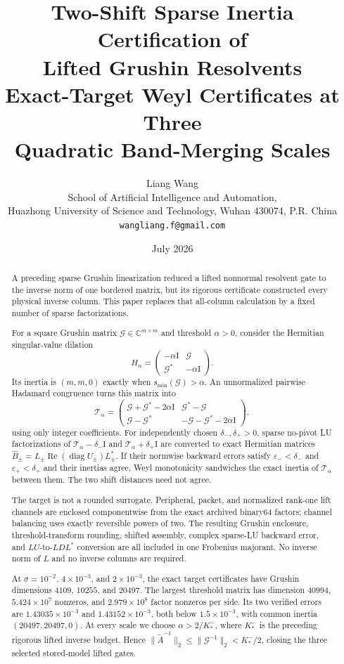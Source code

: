 \documentclass[11pt]{article}
\title{\textbf{Two-Shift Sparse Inertia Certification of\\
Lifted Grushin Resolvents}\\[0.35em]
\large Exact-Target Weyl Certificates at Three\\
Quadratic Band-Merging Scales}
\author{Liang Wang\\
\small School of Artificial Intelligence and Automation,\\[-0.2em]
\small Huazhong University of Science and Technology, Wuhan 430074, P.R. China\\
\small \texttt{wangliang.f@gmail.com}}
\date{July 2026}
\theoremstyle{definition}
\theoremstyle{remark}
\newcommand{\C}{\mathbb C}
\newcommand{\Id}{\mathrm I}
\newcommand{\Atilde}{\widetilde A}
\newcommand{\Gmat}{\mathcal G}
\newcommand{\Tmat}{\mathcal T}
\newcommand{\Bhat}{\widehat B}
\begin{document}
\maketitle

\begin{abstract}
A preceding sparse Grushin linearization reduced a lifted nonnormal
resolvent gate to the inverse norm of one bordered matrix, but its rigorous
certificate constructed every physical inverse column.  This paper replaces
that all-column calculation by a fixed number of sparse factorizations.

For a square Grushin matrix $\Gmat\in\C^{m\times m}$ and threshold
$\alpha>0$, consider the Hermitian singular-value dilation
\[
 H_\alpha=
 \begin{pmatrix}
  -\alpha\Id&\Gmat\\
  \Gmat^*&-\alpha\Id
 \end{pmatrix}.
\]
Its inertia is $(m,m,0)$ exactly when
$s_{\min}(\Gmat)>\alpha$.  An unnormalized pairwise Hadamard congruence
turns this matrix into
\[
 \Tmat_\alpha=
 \begin{pmatrix}
  \Gmat+\Gmat^*-2\alpha\Id&\Gmat^*-\Gmat\\
  \Gmat-\Gmat^*&-\Gmat-\Gmat^*-2\alpha\Id
 \end{pmatrix},
\]
using only integer coefficients.  For independently chosen
$\delta_-,\delta_+>0$, sparse no-pivot LU factorizations of
$\Tmat_\alpha-\delta_-\Id$ and
$\Tmat_\alpha+\delta_+\Id$ are converted to exact Hermitian matrices
$\Bhat_\pm=L_\pm\operatorname{Re}(\operatorname{diag}U_\pm)L_\pm^*$.
If their normwise backward errors satisfy
$\varepsilon_-<\delta_-$ and $\varepsilon_+<\delta_+$ and their inertias
agree, Weyl monotonicity sandwiches the exact inertia of
$\Tmat_\alpha$ between them.  The two shift distances need not agree.

The target is not a rounded surrogate.  Peripheral, packet, and normalized
rank-one lift channels are enclosed componentwise from the exact archived
binary64 factors; channel balancing uses exactly reversible powers of two.
The resulting Grushin enclosure, threshold-transform rounding, shifted
assembly, complex sparse-LU backward error, and $LU$-to-$LDL^*$ conversion
are all included in one Frobenius majorant.  No inverse norm of $L$ and no
inverse columns are required.

At $\sigma=10^{-2}$, $4\times10^{-3}$, and $2\times10^{-3}$, the exact
target certificates have Grushin dimensions $4109$, $10255$, and $20497$.
The largest threshold matrix has dimension $40994$, $5.424\times10^7$
nonzeros, and $2.979\times10^8$ factor nonzeros per side.  Its two verified
errors are $1.43035\times10^{-3}$ and $1.43152\times10^{-3}$, both below
$1.5\times10^{-3}$, with common inertia $(20497,20497,0)$.  At every scale
we choose $\alpha>2/K_*^-$, where $K_*^-$ is the preceding rigorous lifted
inverse budget.  Hence
$\|\Atilde^{-1}\|_2\leq\|\Gmat^{-1}\|_2<K_*^-/2$, closing the three selected
stored-model lifted gates.


\end{abstract}
\end{document}
